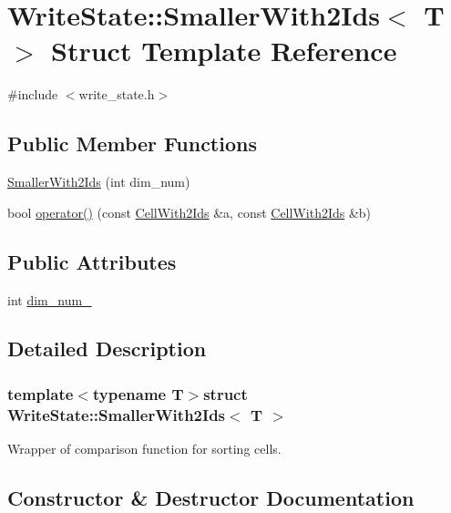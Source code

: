 \hypertarget{structWriteState_1_1SmallerWith2Ids}{}\section{Write\+State\+:\+:Smaller\+With2\+Ids$<$ T $>$ Struct Template Reference}
\label{structWriteState_1_1SmallerWith2Ids}


{\ttfamily \#include $<$write\+\_\+state.\+h$>$}

\subsection*{Public Member Functions}
\begin{DoxyCompactItemize}
\item 
\hyperlink{structWriteState_1_1SmallerWith2Ids_a6ad18e1093cd2fac0bfd342e4da447c3}{Smaller\+With2\+Ids} (int dim\+\_\+num)
\item 
bool \hyperlink{structWriteState_1_1SmallerWith2Ids_a3590c86021a7875998e4937a3aa61c82}{operator()} (const \hyperlink{structWriteState_1_1CellWith2Ids}{Cell\+With2\+Ids} \&a, const \hyperlink{structWriteState_1_1CellWith2Ids}{Cell\+With2\+Ids} \&b)
\end{DoxyCompactItemize}
\subsection*{Public Attributes}
\begin{DoxyCompactItemize}
\item 
int \hyperlink{structWriteState_1_1SmallerWith2Ids_aa3b69aafe98f420cbf57abf88fce2a78}{dim\+\_\+num\+\_\+}
\end{DoxyCompactItemize}


\subsection{Detailed Description}
\subsubsection*{template$<$typename T$>$struct Write\+State\+::\+Smaller\+With2\+Ids$<$ T $>$}

Wrapper of comparison function for sorting cells. 

\subsection{Constructor \& Destructor Documentation}
\hypertarget{structWriteState_1_1SmallerWith2Ids_a6ad18e1093cd2fac0bfd342e4da447c3}{}

